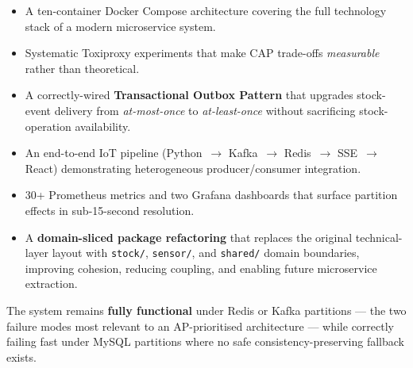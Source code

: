 \documentclass[12pt,a4paper,twoside]{article}
\begin{document}
\begin{itemize}
  \item A ten-container Docker Compose architecture covering the full
        technology stack of a modern microservice system.
  \item Systematic Toxiproxy experiments that make CAP trade-offs
        \emph{measurable} rather than theoretical.
  \item A correctly-wired \textbf{Transactional Outbox Pattern} that
        upgrades stock-event delivery from \emph{at-most-once} to
        \emph{at-least-once} without sacrificing stock-operation availability.
  \item An end-to-end IoT pipeline (Python~$\to$ Kafka~$\to$ Redis~$\to$
        SSE~$\to$ React) demonstrating heterogeneous producer/consumer integration.
  \item 30+ Prometheus metrics and two Grafana dashboards that surface
        partition effects in sub-15-second resolution.
  \item A \textbf{domain-sliced package refactoring} that replaces the original
        technical-layer layout with \texttt{stock/}, \texttt{sensor/}, and
        \texttt{shared/} domain boundaries, improving cohesion, reducing
        coupling, and enabling future microservice extraction.
\end{itemize}

The system remains \textbf{fully functional} under Redis or Kafka
partitions --- the two failure modes most relevant to an AP-prioritised
architecture --- while correctly failing fast under MySQL partitions where
no safe consistency-preserving fallback exists.
\end{document}

